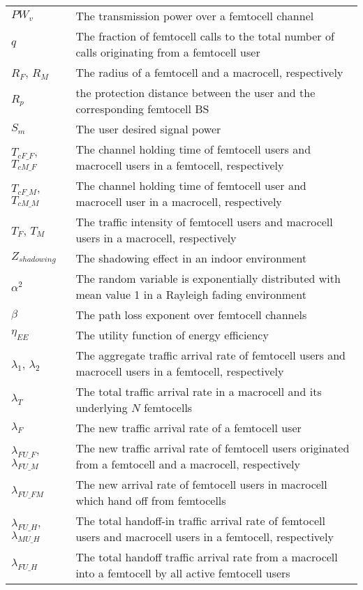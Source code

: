 \documentclass[10pt,final,journal,letterpaper,twoside,twocolumn]{IEEEtran}
\begin{document}
\begin{table*}[htbp]
\begin{tabular}{l|l}
${PW_v}$ & The transmission power over a femtocell channel \\
$q$ & The fraction of femtocell calls to the total number of calls originating from a femtocell user \\
${R_F}$, ${R_M}$ & The radius of a femtocell and a macrocell, respectively \\
${R_p}$ & the protection distance between the user and the corresponding femtocell BS \\
${S_m}$ & The user desired signal power \\
${T_{cF\_F}}$, ${T_{cM\_F}}$ & The channel holding time of femtocell users and macrocell users in a femtocell, respectively \\
${T_{cF\_M}}$, ${T_{cM\_M}}$ & The channel holding time of femtocell user and macrocell user in a macrocell, respectively \\
${T_F}$, ${T_M}$ & The traffic intensity of femtocell users and macrocell users in a macrocell, respectively \\
${Z_{shadowing}}$ & The shadowing effect in an indoor environment \\
${\alpha ^2}$ & The random variable is exponentially distributed with mean value 1 in a Rayleigh fading environment \\
$\beta$ & The path loss exponent over femtocell channels \\
${\eta _{EE}}$ & The utility function of energy efficiency \\
${\lambda _1}$, ${\lambda _2}$ & The aggregate traffic arrival rate of femtocell users and macrocell users in a femtocell, respectively \\
${\lambda _T}$ & The total traffic arrival rate in a macrocell and its underlying ${N}$ femtocells \\
${\lambda _F}$ & The new traffic arrival rate of a femtocell user \\
${\lambda _{FU\_F}}$, ${\lambda _{FU\_M}}$ & The new traffic arrival rate of femtocell users originated from a femtocell and a macrocell, respectively \\
${\lambda_{FU\_FM}}$ & The new arrival rate of femtocell users in macrocell which hand off from femtocells  \\
${\lambda_{FU\_H}}$, ${\lambda_{MU\_H}}$ & The total handoff-in traffic arrival rate of femtocell users and macrocell users in a femtocell, respectively \\
${\lambda_{FU\_H}}$ & The total handoff traffic arrival rate from a macrocell into a femtocell by all active femtocell users \\

\end{tabular}
\end{table*}
\end{document}
